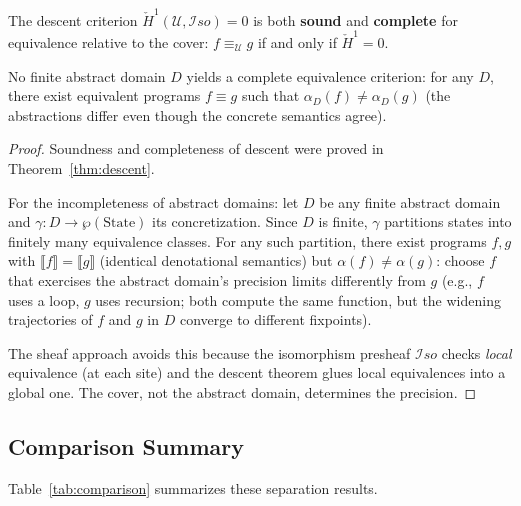 \documentclass[acmsmall,screen]{acmart}
\theoremstyle{remark}
\newcommand{\Hc}[1]{\check{H}^{#1}}
\newcommand{\Iso}{\mathcal{I}\mathit{so}}
\begin{document}
\begin{theorem}\label{thm:equiv-complete}
The descent criterion $\Hc{1}(\mathcal{U}, \Iso) = 0$ is both
\textbf{sound} and \textbf{complete} for equivalence relative to the
cover: $f \equiv_{\mathcal{U}} g$ if and only if $\Hc{1} = 0$.

No finite abstract domain $D$ yields a complete equivalence
criterion: for any $D$, there exist equivalent programs $f \equiv g$
such that $\alpha_D(f) \neq \alpha_D(g)$ (the abstractions differ
even though the concrete semantics agree).
\end{theorem}

\begin{proof}
Soundness and completeness of descent were proved in
Theorem~\ref{thm:descent}.

For the incompleteness of abstract domains: let $D$ be any finite
abstract domain and $\gamma : D \to \wp(\text{State})$ its
concretization.  Since $D$ is finite, $\gamma$ partitions states into
finitely many equivalence classes.  For any such partition, there
exist programs $f, g$ with $\llbracket f \rrbracket = \llbracket g
\rrbracket$ (identical denotational semantics) but
$\alpha(f) \neq \alpha(g)$: choose $f$ that exercises the abstract
domain's precision limits differently from $g$ (e.g., $f$ uses a
loop, $g$ uses recursion; both compute the same function, but the
widening trajectories of $f$ and $g$ in $D$ converge to different
fixpoints).

The sheaf approach avoids this because the isomorphism presheaf
$\Iso$ checks \emph{local} equivalence (at each site) and the
descent theorem glues local equivalences into a global one.
The cover, not the abstract domain, determines the precision.
\end{proof}

\subsection{Comparison Summary}

Table~\ref{tab:comparison} summarizes these separation results.
\end{document}
